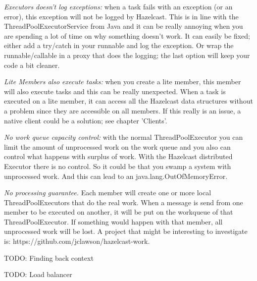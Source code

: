 \emph{Executors doesn't log exceptions:} when a task fails with an exception (or an error), this exception will not be logged by Hazelcast. This is in line with the ThreadPoolExecutorService from Java and it can be really annoying when you are spending a lot of time on why something doesn't work. It can easily be fixed; either add a try/catch in your runnable and log the exception. Or wrap the runnable/callable in a proxy that does the logging; the last option will keep your code a bit cleaner. 

\emph{Lite Members also execute tasks:} when you create a lite member, this member will also execute tasks and this can be really unexpected. When a task is executed on a lite member, it can access all the Hazelcast data structures without a problem since they are accessible on all members. If this really is an issue, a native client could be a solution; see chapter 'Clients'.

\emph{No work queue capacity control:} with the normal ThreadPoolExecutor you can limit the amount of unprocessed work on the work queue and you also can control what happens with surplus of work. With the Hazelcast distributed Executor there is no control. So it could be that you swamp a system with unprocessed work. And this can lead to an java.lang.OutOfMemoryError.

\emph{No processing guarantee.} Each member will create one or more local ThreadPoolExecutors that do the real work. When a message is send from one member to be executed on another, it will be put on the workqueue of that ThreadPoolExecutor. If something would happen with that member, all unprocessed work will be lost. A project that might be interesting to investigate is: https://github.com/jclawson/hazelcast-work.

TODO: Finding back context

TODO: Load balancer

